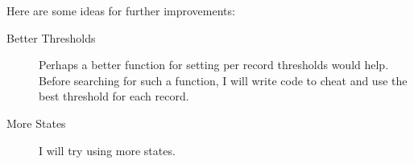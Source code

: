\documentclass[12pt]{article}
\begin{document}


Here are some ideas for further improvements:
\begin{description}
\item[Better Thresholds] Perhaps a better function for setting per
  record thresholds would help.  Before searching for such a function,
  I will write code to cheat and use the best threshold for each
  record.
\item[More States] I will try using more states.
\end{description}
\end{document}
